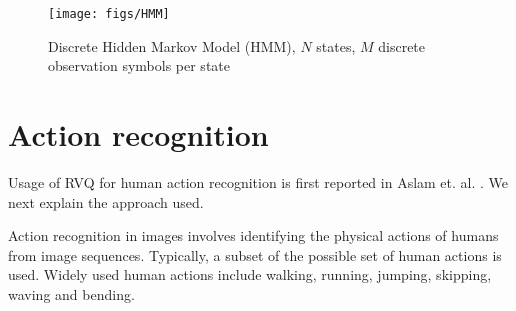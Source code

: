 %
%
%
%
%



								\begin{figure}[t]		
								\texttt{[image: figs/HMM]}
								\caption{Discrete Hidden Markov Model (HMM), $N$ states, $M$ discrete observation symbols per state}
								\label{fig:HMM}
								\end{figure}


\section{Action recognition}
Usage of RVQ for human action recognition is first reported in Aslam et. al. \cite{2010_CNF_HMMRVQ_Aslam}.  We next explain the approach used.

Action recognition in images involves identifying the physical actions of humans from image sequences.  Typically, a subset of the possible set of human actions is used.  Widely used human actions include walking, running, jumping, skipping, waving and bending. 

